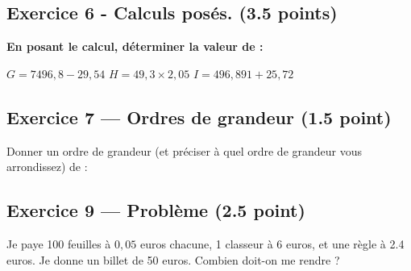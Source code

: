 \documentclass{exam}
\begin{document}
\subsection*{Exercice 6 - Calculs posés. (3.5 points)}

\textbf{En posant le calcul, déterminer la valeur de :}
\begin{questions}
  \question[1] $G = 7496,8 - 29,54$
  \question[1.5] $H = 49,3 \times 2,05$
  \question[1] $I = 496,891 + 25,72$
\end{questions}

\subsection*{Exercice 7 — Ordres de grandeur (1.5 point)}

\begin{questions}
  \question Donner un ordre de grandeur (et préciser à quel ordre de grandeur vous arrondissez) de :

  
\end{questions}

\subsection*{Exercice 9 — Problème (2.5 point)}

\begin{questions}
  \question Je paye 100 feuilles à $0,05$ euros chacune, 1 classeur à 6 euros, et une règle à 2.4 euros. Je donne un billet de 50 euros.  
  Combien doit-on me rendre ?
\end{questions}
\end{document}
